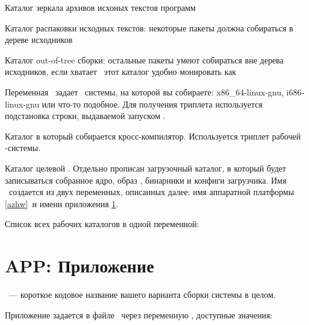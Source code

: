 \bigskip
Каталог зеркала архивов исхоных текстов программ


Каталог распаковки исходных текстов: некоторые пакеты должна собираться в дереве
исходников


Каталог out-of-tree сборки: остальные пакеты умеют собираться вне дерева
исходников, если хватает \ram\ этот каталог удобно монировать как 


Переменная \ задает \ системы, на которой вы
собираете: x86\_64-linux-gnu, i686-linux-gnu или что-то подобное. Для получения
триплета используется подстановка строки, выдаваемой запуском .


Каталог в который собирается кросс-компилятор. Используется триплет
рабочей \linux-системы.


Каталог целевой . Отдельно прописан загрузочный каталог, в который
будет записываться собранное ядро, образ , бинарники и конфиги
загрузчика. Имя \ создается из двух переменных, описанных далее: имя
аппаратной платформы \ref{azhw}\ и имени приложения
\ref{azapp}.


Список всех рабочих каталогов в одной переменной:


\section{APP: Приложение}\label{azapp}

\ --- короткое кодовое название вашего варианта сборки системы
в целом.

Приложение задается в файле \ через
переменную , доступные значения:

